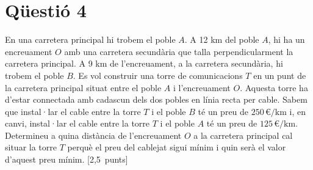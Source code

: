 \documentclass[11pt,a4paper]{article}
\begin{document}
\section*{\textcolor{blauPista}{Qüestió 4}}

\noindent En una carretera principal hi trobem el poble $A$. A 12 km del poble $A$, hi ha un encreuament $O$ amb una carretera secundària que talla perpendicularment la carretera principal. A 9 km de l'encreuament, a la carretera secundària, hi trobem el poble $B$. Es vol construir una torre de comunicacions $T$ en un punt de la carretera principal situat entre el poble $A$ i l'encreuament $O$. Aquesta torre ha d'estar connectada amb cadascun dels dos pobles en línia recta per cable. Sabem que instal·lar el cable entre la torre $T$ i el poble $B$ té un preu de $250\,\euro/\text{km}$ i, en canvi, instal·lar el cable entre la torre $T$ i el poble $A$ té un preu de $125\,\euro/\text{km}$. Determineu a quina distància de l'encreuament $O$ a la carretera principal cal situar la torre $T$ perquè el preu del cablejat sigui mínim i quin serà el valor d'aquest preu mínim. \hspace*{\fill}\textnormal{[2,5~punts]}

\end{document}
